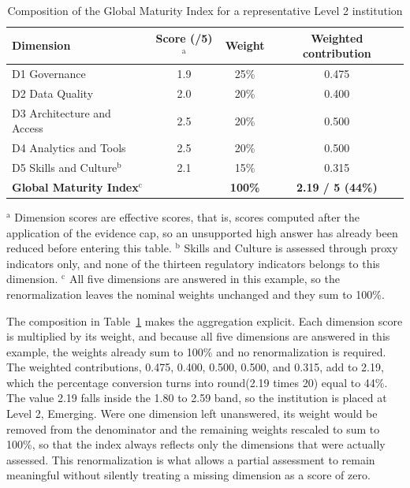 \begin{table}[H]
\centering
\caption{Composition of the Global Maturity Index for a representative Level 2 institution}
\label{tab:profile-breakdown}
\begin{tabular}{|p{4.6cm}|c|c|c|}
\hline
\textbf{Dimension} & \textbf{Score (/5)}$^{\mathrm{a}}$ & \textbf{Weight} & \textbf{Weighted contribution} \\
\hline
D1 Governance & 1.9 & 25\% & 0.475 \\
D2 Data Quality & 2.0 & 20\% & 0.400 \\
D3 Architecture and Access & 2.5 & 20\% & 0.500 \\
D4 Analytics and Tools & 2.5 & 20\% & 0.500 \\
D5 Skills and Culture$^{\mathrm{b}}$ & 2.1 & 15\% & 0.315 \\
\hline
\textbf{Global Maturity Index}$^{\mathrm{c}}$ & & \textbf{100\%} & \textbf{2.19 / 5 (44\%)} \\
\hline
\end{tabular}
\par\vspace{4pt}
\parbox{12.5cm}{\footnotesize
$^{\mathrm{a}}$ Dimension scores are effective scores, that is, scores computed after the application of the evidence cap, so an unsupported high answer has already been reduced before entering this table.
$^{\mathrm{b}}$ Skills and Culture is assessed through proxy indicators only, and none of the thirteen regulatory indicators belongs to this dimension.
$^{\mathrm{c}}$ All five dimensions are answered in this example, so the renormalization leaves the nominal weights unchanged and they sum to 100\%.}
\end{table}

The composition in Table~\ref{tab:profile-breakdown} makes the aggregation explicit. Each dimension score is multiplied by its weight, and because all five dimensions are answered in this example, the weights already sum to 100\% and no renormalization is required. The weighted contributions, 0.475, 0.400, 0.500, 0.500, and 0.315, add to 2.19, which the percentage conversion turns into round(2.19 times 20) equal to 44\%. The value 2.19 falls inside the 1.80 to 2.59 band, so the institution is placed at Level 2, Emerging. Were one dimension left unanswered, its weight would be removed from the denominator and the remaining weights rescaled to sum to 100\%, so that the index always reflects only the dimensions that were actually assessed. This renormalization is what allows a partial assessment to remain meaningful without silently treating a missing dimension as a score of zero.

